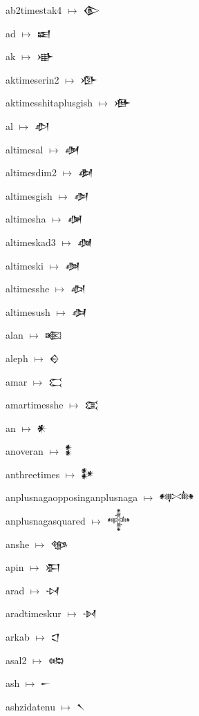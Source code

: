 {\noindent ab2timestak4 $\mapsto$ {\cufont 𒀛}\par
\noindent ad $\mapsto$ {\cufont 𒀜}\par
\noindent ak $\mapsto$ {\cufont 𒀝}\par
\noindent aktimeserin2 $\mapsto$ {\cufont 𒀞}\par
\noindent aktimesshitaplusgish $\mapsto$ {\cufont 𒀟}\par
\noindent al $\mapsto$ {\cufont 𒀠}\par
\noindent altimesal $\mapsto$ {\cufont 𒀡}\par
\noindent altimesdim2 $\mapsto$ {\cufont 𒀢}\par
\noindent altimesgish $\mapsto$ {\cufont 𒀣}\par
\noindent altimesha $\mapsto$ {\cufont 𒀤}\par
\noindent altimeskad3 $\mapsto$ {\cufont 𒀥}\par
\noindent altimeski $\mapsto$ {\cufont 𒀦}\par
\noindent altimesshe $\mapsto$ {\cufont 𒀧}\par
\noindent altimesush $\mapsto$ {\cufont 𒀨}\par
\noindent alan $\mapsto$ {\cufont 𒀩}\par
\noindent aleph $\mapsto$ {\cufont 𒀪}\par
\noindent amar $\mapsto$ {\cufont 𒀫}\par
\noindent amartimesshe $\mapsto$ {\cufont 𒀬}\par
\noindent an $\mapsto$ {\cufont 𒀭}\par
\noindent anoveran $\mapsto$ {\cufont 𒀮}\par
\noindent anthreetimes $\mapsto$ {\cufont 𒀯}\par
\noindent anplusnagaopposinganplusnaga $\mapsto$ {\cufont 𒀰}\par
\noindent anplusnagasquared $\mapsto$ {\cufont 𒀱}\par
\noindent anshe $\mapsto$ {\cufont 𒀲}\par
\noindent apin $\mapsto$ {\cufont 𒀳}\par
\noindent arad $\mapsto$ {\cufont 𒀴}\par
\noindent aradtimeskur $\mapsto$ {\cufont 𒀵}\par
\noindent arkab $\mapsto$ {\cufont 𒀶}\par
\noindent asal2 $\mapsto$ {\cufont 𒀷}\par
\noindent ash $\mapsto$ {\cufont 𒀸}\par
\noindent ashzidatenu $\mapsto$ {\cufont 𒀹}\par
}
